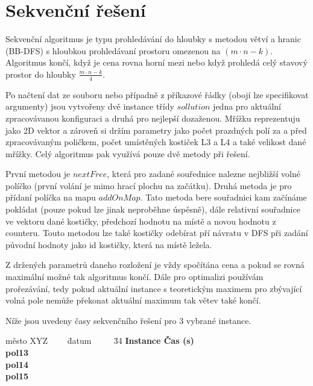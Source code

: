 \documentclass[]{article}
\begin{document}
\section{Sekvenční řešení}
Sekvenční algoritmus je typu prohledávání do hloubky s metodou větví a hranic (BB-DFS) s hloubkou prohle\-dávaní prostoru omezenou na $(m \cdot n-k)$.
Algoritmus končí, když je cena rovna horní mezi nebo když prohledá celý stavový prostor do hloubky $\frac{m \cdot n-k}{4}
$.

Po načtení dat ze souboru nebo případně z příkazové řádky (obojí lze specifikovat argumenty) jsou vytvořeny dvě instance třídy $sollution$ jedna pro aktuální zpracovávanou konfiguraci a druhá pro nejlepší dozaženou. Mřížku reprezentuju jako 2D vektor a zároveň si držím parametry jako počet prazdných polí za a před zpracovávaným poličkem, počet umístěných kostiček L3 a L4 a také velikost dané mřížky. Celý algoritmus pak využívá pouze dvě metody při řešení. 

První metodou je $nextFree$, která pro zadané souřednice nalezne nejbližší volné políčko (první volání je mimo hrací plochu na začátku). Druhá metoda je pro přídaní políčka na mapu $addOnMap$. Tato metoda bere souřadnici kam začínáme pokládat (pouze pokud lze jinak neproběhne úspěsně), dále relativní souřadnice ve vektoru dané kostičky, předchozí hodnotu na místě a novou hodnotu z counteru. Touto metodou lze také kostičky odebírat pří návratu v DFS při zadání původní hodnoty jako id kostičky, která na místě ležela. 

Z držených parametrů daneho rozložení je vždy spočítána cena a pokud se rovná maximální možné tak algoritmus končí. Dále pro optimalizi používám prořezávání, tedy pokud aktuální instance s teoretickým maximem pro zbývající volná pole nemůže překonat aktuální maximum tak větev také končí.

Níže jsou uvedeny časy sekvenčního řešení pro 3 vybrané instance.

\begin{center}
\parbox{0cm}{\begin{tabbing}
 město XYZ ~~~~\= datum ~~~~
    \= 34 \kill
    \bfseries Instance \>
    \bfseries Čas (s) \>
    \\[2mm]
    pol13  \>  \\
    pol14  \> \\
    pol15  \> 
\end{tabbing}}
\end{center}
\end{document}
